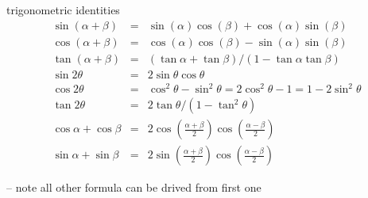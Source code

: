 \documentclass[17pt,landscape]{foils}
\newcounter{numsectionsforwhichproofexists}
\begin{document}
\begin{myformula}{trigonometric identities}
\begin{eqnarray*}
\sin(\alpha + \beta) &=& \sin(\alpha)\cos(\beta) + \cos(\alpha)\sin(\beta)
\\
\cos(\alpha + \beta) &=& \cos(\alpha)\cos(\beta) - \sin(\alpha)\sin(\beta)
\\
\tan(\alpha + \beta) &=& (\tan\alpha + \tan \beta) / (1-\tan\alpha\tan\beta)
\\
\sin 2\theta
&=&
2\sin\theta\cos\theta
\\
\cos 2\theta
&=&
\cos^2\theta- \sin^2\theta = 2\cos^2\theta - 1 = 1-2\sin^2\theta
\\
\tan2\theta &=& 2\tan\theta / (1-\tan^2\theta)
\\
\cos \alpha + \cos \beta
&=&
2\cos \left(\frac{\alpha + \beta}{2}\right) \cos \left(\frac{\alpha - \beta}{2}\right)
\\
\sin \alpha + \sin \beta
&=&
2\sin \left(\frac{\alpha + \beta}{2}\right) \cos \left(\frac{\alpha - \beta}{2}\right)
\end{eqnarray*}
\end{myformula}
-- note all other formula can be drived from first one
\fi
{}
\myfoilhead{}


\end{document}
